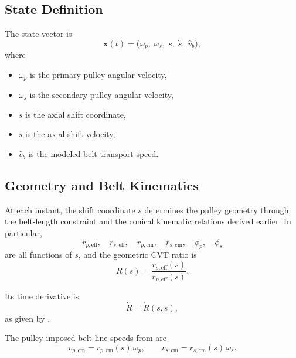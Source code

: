 \documentclass[11pt]{article}
\numberwithin{equation}{section}
\begin{document}
\subsection{State Definition}

The state vector is
\begin{equation}
\mathbf{x}(t)
=
\big(
\omega_p,\;
\omega_s,\;
s,\;
\dot s,\;
\hat v_b
\big),
\label{eq:state_vector_complete}
\end{equation}
where
\begin{itemize}
    \item \(\omega_p\) is the primary pulley angular velocity,
    \item \(\omega_s\) is the secondary pulley angular velocity,
    \item \(s\) is the axial shift coordinate,
    \item \(\dot s\) is the axial shift velocity,
    \item \(\hat v_b\) is the modeled belt transport speed.
\end{itemize}

\subsection{Geometry and Belt Kinematics}

At each instant, the shift coordinate \(s\) determines the pulley geometry
through the belt-length constraint and the conical kinematic relations derived
earlier.
In particular,
\[
r_{p,\mathrm{eff}},\quad
r_{s,\mathrm{eff}},\quad
r_{p,\mathrm{cm}},\quad
r_{s,\mathrm{cm}},\quad
\phi_p,\quad
\phi_s
\]
are all functions of \(s\), and the geometric CVT ratio is
\begin{equation}
R(s)
=
\frac{r_{s,\mathrm{eff}}(s)}{r_{p,\mathrm{eff}}(s)}.
\label{eq:R_of_s_complete}
\end{equation}

Its time derivative is
\begin{equation}
\dot R = \dot R(s,\dot s),
\label{eq:Rdot_of_states_complete}
\end{equation}
as given by .

The pulley-imposed belt-line speeds from  are
\begin{equation}
v_{p,\mathrm{cm}}
=
r_{p,\mathrm{cm}}(s)\,\omega_p,
\qquad
v_{s,\mathrm{cm}}
=
r_{s,\mathrm{cm}}(s)\,\omega_s.
\label{eq:belt_line_speeds_complete}
\end{equation}
\end{document}
